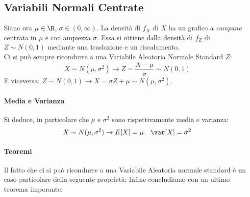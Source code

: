 \subsection{Variabili Normali Centrate}
Siano ora $\mu \in \R$, $\sigma \in (0, \infty)$.
La densità di $f_X$ di $X$ ha un grafico a \emph{campana} centrata in $\mu$ e con ampiezza $\sigma$.
Essa si ottiene dalla densità di $f_Z$ di $Z \sim N(0,1)$
mediante una traslazione e un riscalamento.
\\Ci si può sempre ricondurre a una Variabile Aleatoria Normale Standard $Z$:
\[
	X \sim N(\mu, \sigma^2) \rightarrow Z = \frac{X-\mu}{\sigma} \sim N(0,1)
\]
E viceversa: $ Z \sim N(0,1) \rightarrow X = \sigma Z + \mu \sim N(\mu, \sigma^2) $.
\paragraph{Media e Varianza}
Si deduce, in particolare che $\mu$ e $\sigma^2$ sono rispettivamente media e varianza:
\[
	X \sim N(\mu, \sigma^2) \rightarrow E[X] = \mu \quad \var[X] = \sigma^2
\]
\paragraph{Teoremi}
Il fatto che ci si può ricondurre a una Variabile Aleatoria normale standard è un caso particolare
della seguente proprietà:
Infine concludiamo con un ultimo teorema imporante:

